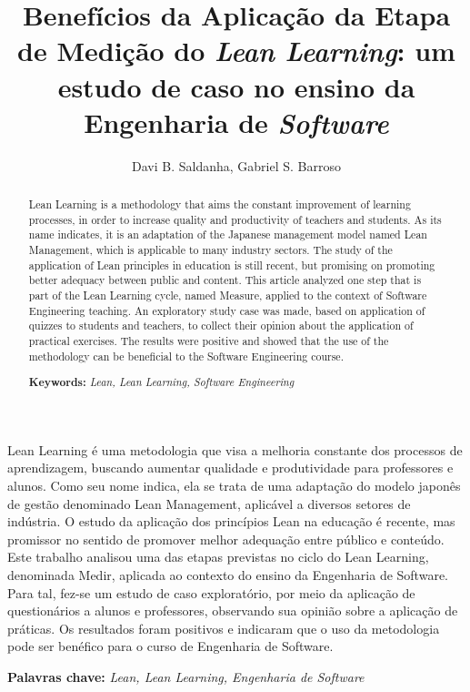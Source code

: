 \documentclass[12pt]{article}
\title{Benefícios da Aplicação da Etapa de Medição do \textit{Lean Learning}: um estudo de
caso no ensino da Engenharia de \textit{Software}}
\author{Davi B. Saldanha\inst{1}, Gabriel S. Barroso\inst{1}}
\begin{document}
 

\maketitle

\begin{abstract}
  Lean Learning is a methodology that aims the constant improvement of learning processes, in order to increase quality and productivity of teachers and students. As its name indicates, it is an adaptation of the Japanese management model named Lean Management, which is applicable to many industry sectors. The study of the application of Lean principles in education is still recent, but promising on promoting better adequacy between public and content. This article analyzed one step that is part of the Lean Learning cycle, named Measure, applied to the context of Software Engineering teaching. An exploratory study case was made, based on application of quizzes to students and teachers, to collect their opinion about the application of practical exercises. The results were positive and showed that the use of the methodology can be beneficial to the Software Engineering course.
  
  \textbf{Keywords:} \emph{Lean, Lean Learning, Software Engineering}
\end{abstract}
     
\begin{resumo} 
  Lean Learning é uma metodologia que visa a melhoria constante dos processos de aprendizagem, buscando aumentar qualidade e produtividade para professores e alunos. Como seu nome indica, ela se trata de uma adaptação do modelo japonês de gestão denominado Lean Management, aplicável a diversos setores de indústria. O estudo da aplicação dos princípios Lean na educação é recente, mas promissor no sentido de promover melhor adequação entre público e conteúdo. Este trabalho analisou uma das etapas previstas no ciclo do Lean Learning, denominada Medir, aplicada ao contexto do ensino da Engenharia de Software. Para tal, fez-se um estudo de caso exploratório, por meio da aplicação de questionários a alunos e professores, observando sua opinião sobre a aplicação de práticas. Os resultados foram positivos e indicaram que o uso da metodologia pode ser benéfico para o curso de Engenharia de Software. 
    
  \textbf{Palavras chave:} \emph{\textit{Lean}, \textit{Lean Learning}, Engenharia de \textit{Software}}
\end{resumo}
\end{document}
